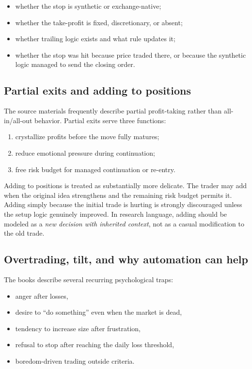 \begin{itemize}[leftmargin=1.5em]
\item whether the stop is synthetic or exchange-native;
\item whether the take-profit is fixed, discretionary, or absent;
\item whether trailing logic exists and what rule updates it;
\item whether the stop was hit because price traded there, or because the synthetic logic managed to send the closing order.
\end{itemize}

\subsection{Partial exits and adding to positions}

The source materials frequently describe partial profit-taking rather than all-in/all-out behavior. Partial exits serve three functions:

\begin{enumerate}[leftmargin=1.5em]
\item crystallize profits before the move fully matures;
\item reduce emotional pressure during continuation;
\item free risk budget for managed continuation or re-entry.
\end{enumerate}

Adding to positions is treated as substantially more delicate. The trader may add when the original idea strengthens and the remaining risk budget permits it. Adding simply because the initial trade is hurting is strongly discouraged unless the setup logic genuinely improved. In research language, adding should be modeled as a \emph{new decision with inherited context}, not as a casual modification to the old trade.

\subsection{Overtrading, tilt, and why automation can help}

The books describe several recurring psychological traps:

\begin{itemize}[leftmargin=1.5em]
\item anger after losses,
\item desire to ``do something'' even when the market is dead,
\item tendency to increase size after frustration,
\item refusal to stop after reaching the daily loss threshold,
\item boredom-driven trading outside criteria.
\end{itemize}

